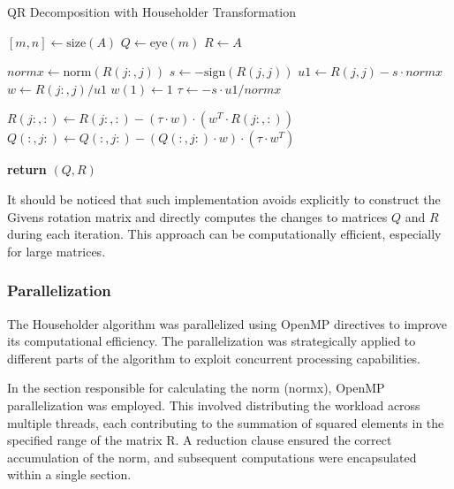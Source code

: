 \documentclass{article}
\begin{document}
\begin{algorithm}
\caption{QR Decomposition with Householder Transformation}
\begin{algorithmic}[1]
    \State $[m, n] \gets \text{size}(A)$
    \State $Q \gets \text{eye}(m)$ 
    \State $R \gets A$ 
    
        \State {}
        \State $normx \gets \text{norm}(R(j{:}, j))$
        \State $s \gets -\text{sign}(R(j, j))$
        \State $u1 \gets R(j, j) - s \cdot normx$
        \State $w \gets R(j{:}, j) / u1$
        \State $w(1) \gets 1$
        \State $\tau \gets -s \cdot u1 / normx$
        
        \State {}
        \State $R(j{:}, :) \gets R(j{:}, :) - (\tau \cdot w) \cdot (w^T \cdot R(j{:}, :))$
        \State $Q(:, j{:}) \gets Q(:, j{:}) - (Q(:, j{:}) \cdot w) \cdot (\tau \cdot w^T)$
    \EndFor
    
    \State \textbf{return} $(Q, R)$
\EndFunction
\end{algorithmic}
\end{algorithm}

It should be noticed that such implementation avoids explicitly to construct the Givens rotation matrix and directly computes the changes to matrices $Q$ and $R$ during each iteration. This approach can be computationally efficient, especially for large matrices.

\subsubsection{Parallelization}
The Householder algorithm was parallelized using OpenMP directives to improve its computational efficiency. The parallelization was strategically applied to different parts of the algorithm to exploit concurrent processing capabilities.

In the section responsible for calculating the norm (normx), OpenMP parallelization was employed. This involved distributing the workload across multiple threads, each contributing to the summation of squared elements in the specified range of the matrix R. A reduction clause ensured the correct accumulation of the norm, and subsequent computations were encapsulated within a single section.
\end{document}
